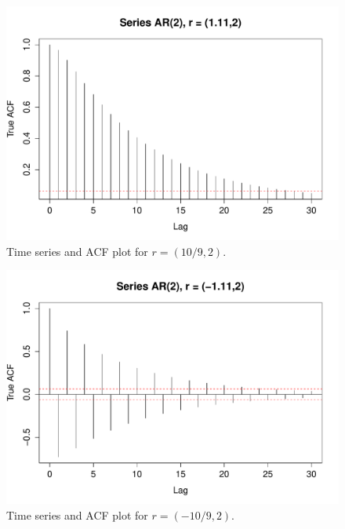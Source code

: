 \documentclass[10pt,a4paper]{article}
\begin{document}
\begin{figure}[h!]
\includegraphics[width=\linewidth]{plots/p7_1_2.pdf}
\caption{Time series and ACF plot for $r=(10/9, 2)$.}
\end{figure}

\begin{figure}[h!]
\includegraphics[width=\linewidth]{plots/p7_neg_1_2.pdf}
\caption{Time series and ACF plot for $r=(-10/9, 2)$.}
\end{figure}
\end{document}
